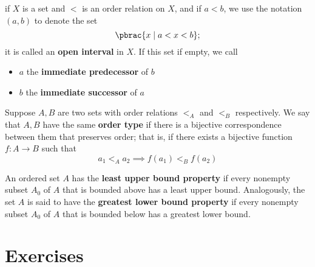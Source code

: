 \begin{definition}
  if $X$ is a set and $<$ is an order relation on $X$, and if $a<b$, we use the notation $(a, b)$ to denote the set
  \begin{equation}
    \pbrac{
      x \mid a < x < b
    };
  \end{equation}
  it is called an \textbf{open interval} in $X$. If this set if empty, we call
  \begin{itemize}
    \item $a$ the \textbf{immediate predecessor} of $b$
    \item $b$ the \textbf{immediate successor} of $a$
  \end{itemize}
\end{definition}

\begin{definition}
  Suppose $A, B$ are two sets with order relations $<_A$ and $<_B$ respectively. We say that $A, B$ have the same \textbf{order type} if there is a bijective correspondence between them that preserves order; that is, if there exists a bijective function $f : A \to B$ such that
  \begin{equation}
    a_1 <_A a_2 \implies f(a_1) <_B f(a_2)
  \end{equation}
\end{definition}

\begin{definition}
  An ordered set $A$ has the \textbf{least upper bound property} if every
  nonempty subset $A_0$ of $A$ that is bounded above has a least upper bound.
  Analogously, the set $A$ is said to have the \textbf{greatest lower bound
  property} if every nonempty subset $A_0$ of $A$ that is bounded below has a
  greatest lower bound.
\end{definition}

\section*{Exercises}

\bx{

}

